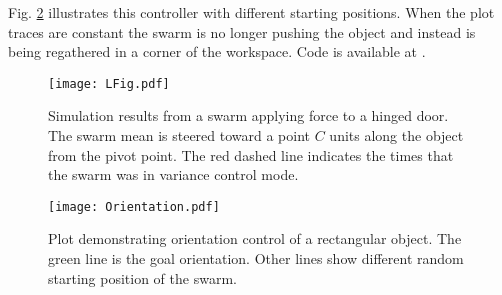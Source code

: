 %

Fig. \ref{fig:OrientCont} illustrates this controller with different starting positions. When the plot traces are constant the swarm is no longer pushing the object and instead is being regathered in a corner of the workspace. Code is available at \cite{Shahrokhi16Orient}.




\begin{figure}
\begin{center}
	\texttt{[image: LFig.pdf]}
\end{center}
\vspace{-1em}
\caption{\label{fig:LFig}
Simulation results from a swarm applying force to a hinged door. 
The swarm mean is steered toward a point $C$ units along the object from the pivot point. The red dashed line indicates the times that the swarm was in variance control mode.
}
\vspace{-1em}
\end{figure}





\begin{figure}
\begin{center}
	\texttt{[image: Orientation.pdf]}
\end{center}
\vspace{-1em}
\caption{\label{fig:OrientCont}
Plot demonstrating  orientation control of a rectangular object. The green line is the goal orientation. Other lines show different random starting position of the swarm.%
}
\vspace{-1em}
\end{figure}




